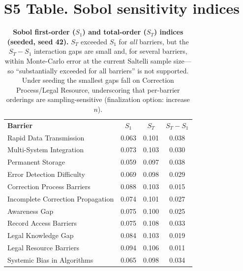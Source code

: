 \documentclass[10pt,letterpaper]{article}
\newlength\savedwidth
\newcommand\thickhline{\noalign{\global\savedwidth\arrayrulewidth\global\arrayrulewidth 2pt}\hline\noalign{\global\arrayrulewidth\savedwidth}}
\begin{document}
\section*{S5 Table. Sobol sensitivity indices}
\begin{table}[!ht]\centering
\caption{{\bf Sobol first-order ($S_1$) and total-order ($S_T$) indices (seeded, seed 42).} $S_T$ exceeded $S_1$ for \emph{all} barriers, but the $S_T-S_1$ interaction gaps are small and, for several barriers, within Monte-Carlo error at the current Saltelli sample size---so ``substantially exceeded for all barriers'' is not supported. Under seeding the smallest gaps fall on Correction Process/Legal Resource, underscoring that per-barrier orderings are sampling-sensitive (finalization option: increase $n$).}
\label{S5}
\begin{tabular}{l c c c}
\hline \textbf{Barrier} & \textbf{$S_1$} & \textbf{$S_T$} & \textbf{$S_T-S_1$} \\ \thickhline
Rapid Data Transmission & 0.063 & 0.101 & 0.038 \\
Multi-System Integration & 0.073 & 0.103 & 0.030 \\
Permanent Storage & 0.059 & 0.097 & 0.038 \\
Error Detection Difficulty & 0.069 & 0.098 & 0.029 \\
Correction Process Barriers & 0.088 & 0.103 & 0.015 \\
Incomplete Correction Propagation & 0.074 & 0.101 & 0.027 \\
Awareness Gap & 0.075 & 0.100 & 0.025 \\
Record Access Barriers & 0.075 & 0.108 & 0.033 \\
Legal Knowledge Gap & 0.084 & 0.103 & 0.019 \\
Legal Resource Barriers & 0.094 & 0.106 & 0.011 \\
Systemic Bias in Algorithms & 0.065 & 0.098 & 0.034 \\ \hline
\end{tabular}
\end{table}

\end{document}
